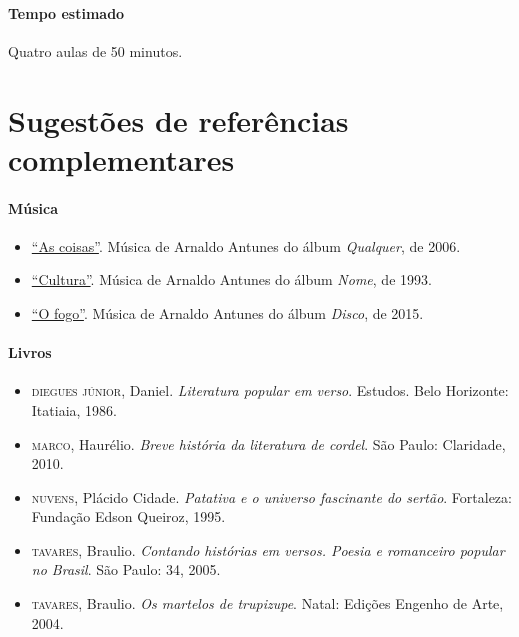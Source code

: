 \documentclass[11pt]{extarticle}
\begin{document}
\paragraph{Tempo estimado} Quatro aulas de 50 minutos.


\section{Sugestões de referências complementares}

\paragraph{Música}

\begin{itemize}
\item \href{https://www.youtube.com/watch?v=JF4MruZSwzg}{``As coisas''}. Música de Arnaldo Antunes do álbum \textit{Qualquer}, de 2006. 

\item \href{https://www.youtube.com/watch?v=Aguu_QzCQy8}{``Cultura''}. Música de Arnaldo Antunes do álbum \textit{Nome}, de 1993. 

\item \href{https://www.youtube.com/watch?v=kUgUNHj2VlE}{``O fogo''}. Música de Arnaldo Antunes do álbum \textit{Disco}, de 2015. 
\end{itemize}


\paragraph{Livros}

\begin{itemize}
\item \textsc{diegues júnior}, Daniel. \textit{Literatura popular em verso}. Estudos. Belo Horizonte: Itatiaia, 1986. 

\item \textsc{marco}, Haurélio. \textit{Breve história da literatura de cordel}. São Paulo: Claridade, 2010.

\item \textsc{nuvens}, Plácido Cidade. \textit{Patativa e o universo fascinante
do sertão}. Fortaleza: Fundação Edson Queiroz, 1995.

\item \textsc{tavares}, Braulio. \textit{Contando histórias em versos. Poesia e romanceiro popular no Brasil}. São Paulo: 34, 2005.

\item \textsc{tavares}, Braulio. \textit{Os martelos de trupizupe}. Natal: Edições Engenho de Arte, 2004.
\end{itemize}
\end{document}
